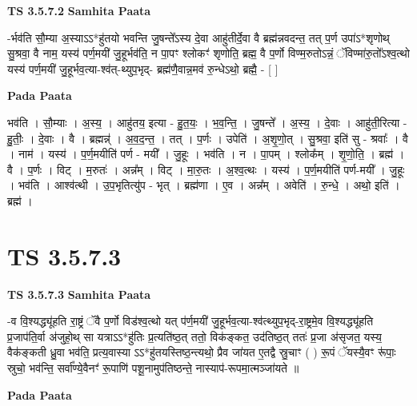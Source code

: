 \documentclass[17pt]{extarticle}
\begin{document}
\textbf{TS 3.5.7.2 } \newline
\textbf{Samhita Paata} \newline

-र्भव॑ति सौ॒म्या अ॒स्याऽऽ*हु॑तयो भवन्ति जु॒षन्ते᳚ऽस्य दे॒वा आहु॑तीर्दे॒वा वै ब्रह्म॑न्नवदन्त॒ तत् प॒र्ण उपा॑ऽ*शृणोथ् सु॒श्रवा॒ वै नाम॒ यस्य॑ पर्ण॒मयी॑ जु॒हूर्भव॑ति॒ न पा॒पꣳ श्लोकꣳ॑ शृणोति॒ ब्रह्म॒ वै प॒र्णो विण्म॒रुतोऽन्नं॒ ॅविण्मा॑रु॒तो᳚ऽश्व॒त्थो यस्य॑ पर्ण॒मयी॑ जु॒हूर्भव॒त्या-श्व॑त्-थ्युप॒भृद्- ब्रह्म॑णै॒वान्न॒मव॑ रु॒न्धेऽथो॒ ब्रह्मै॒ - [  ] \newline

\textbf{Pada Paata} \newline

भव॑ति । सौ॒म्याः । अ॒स्य॒ । आहु॑तय॒ इत्या - हु॒त॒यः॒ । भ॒व॒न्ति॒ । जु॒षन्ते᳚ । अ॒स्य॒ । दे॒वाः । आहु॑ती॒रित्या - हु॒तीः॒ । दे॒वाः । वै । ब्रह्मन्न्॑ । अ॒व॒द॒न्त॒ । तत् । प॒र्णः । उपेति॑ । अ॒शृ॒णो॒त् । सु॒श्रवा॒ इति॑ सु - श्रवाः᳚ । वै । नाम॑ । यस्य॑ । प॒र्ण॒मयीति॑ पर्ण - मयी᳚ । जु॒हूः । भव॑ति । न । पा॒पम् । श्लोक᳚म् । शृ॒णो॒ति॒ । ब्रह्म॑ । वै । प॒र्णः । विट् । म॒रुतः॑ । अन्न᳚म् । विट् । मा॒रु॒तः । अ॒श्व॒त्थः । यस्य॑ । प॒र्ण॒मयीति॑ पर्ण-मयी᳚ । जु॒हूः । भव॑ति । आश्व॑त्थी । उ॒प॒भृतित्यु॑प - भृत् । ब्रह्म॑णा । ए॒व । अन्न᳚म् । अवेति॑ । रु॒न्धे॒ । अथो॒ इति॑ । ब्रह्म॑ ।  \newline





\section{ TS 3.5.7.3 }

\textbf{TS 3.5.7.3 } \newline
\textbf{Samhita Paata} \newline

-व वि॒श्यद्ध्यू॑हति रा॒ष्ट्रं ॅवै प॒र्णो विड॑श्व॒त्थो यत् प॑र्ण॒मयी॑ जु॒हूर्भव॒त्या-श्व॑त्थ्युप॒भृद्-रा॒ष्ट्रमे॒व वि॒श्यद्ध्यू॑हति प्र॒जाप॑ति॒र्वा अ॑जुहो॒थ् सा यत्राऽऽ*हु॑तिः प्र॒त्यति॑ष्ठ॒त् ततो॒ विक॑ङ्कत॒ उद॑तिष्ठ॒त् ततः॑ प्र॒जा अ॑सृजत॒ यस्य॒ वैक॑ङ्कती ध्रु॒वा भव॑ति॒ प्रत्य॒वास्या ऽऽ*हु॑तयस्तिष्ठ॒न्त्यथो॒ प्रैव जा॑यत ए॒तद्वै स्रु॒चाꣳ ( ) रू॒पं ॅयस्यै॒वꣳ रू॑पाः॒ स्रुचो॒ भव॑न्ति॒ सर्वा᳚ण्ये॒वैनꣳ॑ रू॒पाणि॑ पशू॒नामुप॑तिष्ठन्ते॒ नास्याप॑-रूपमा॒त्मञ्जा॑यते ॥ \newline

\textbf{Pada Paata} \newline
\end{document}
